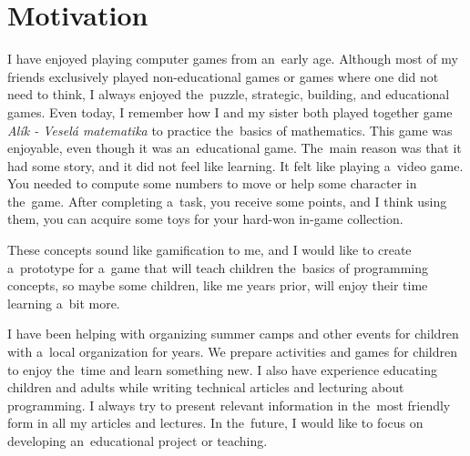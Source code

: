 \section{Motivation}

I have enjoyed playing computer games from an~early age.
Although most of my friends exclusively played non-educational games or games where one did not need to think, I always enjoyed the~puzzle, strategic, building, and educational games.
Even today, I remember how I and my sister both played together game \emph{Alík - Veselá matematika} to practice the~basics of mathematics.
This game was enjoyable, even though it was an~educational game.
The~main reason was that it had some story, and it did not feel like learning.
It felt like playing a~video game.
You needed to compute some numbers to move or help some character in the~game.
After completing a~task, you receive some points, and I think using them, you can acquire some toys for your hard-won in-game collection.

These concepts sound like gamification to me, and I would like to create a~prototype for a~game that will teach children the~basics of programming concepts, so maybe some children, like me years prior, will enjoy their time learning a~bit more.

I have been helping with organizing summer camps and other events for children with a~local organization for years.
We prepare activities and games for children to enjoy the~time and learn something new.
I also have experience educating children and adults while writing technical articles and lecturing about programming.
I always try to present relevant information in the~most friendly form in all my articles and lectures.
In the~future, I would like to focus on developing an~educational project or teaching.
